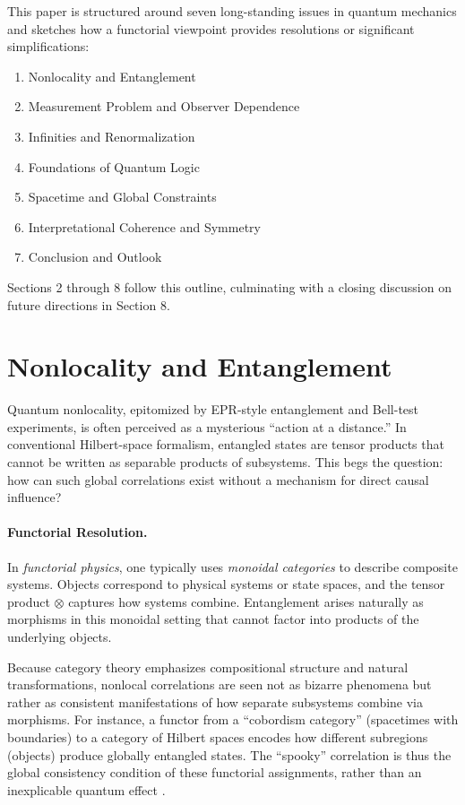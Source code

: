 \documentclass[12pt]{article}
\begin{document}
This paper is structured around seven long-standing issues in quantum mechanics and sketches how a functorial viewpoint provides resolutions or significant simplifications:

\begin{enumerate}
    \item Nonlocality and Entanglement
    \item Measurement Problem and Observer Dependence
    \item Infinities and Renormalization
    \item Foundations of Quantum Logic
    \item Spacetime and Global Constraints
    \item Interpretational Coherence and Symmetry
    \item Conclusion and Outlook
\end{enumerate}

Sections 2 through 8 follow this outline, culminating with a closing discussion on future directions in Section 8.

\vspace{1em}

\section{Nonlocality and Entanglement}
Quantum nonlocality, epitomized by EPR-style entanglement and Bell-test experiments, is often perceived as a mysterious ``action at a distance.'' In conventional Hilbert-space formalism, entangled states are tensor products that cannot be written as separable products of subsystems. This begs the question: how can such global correlations exist without a mechanism for direct causal influence?

\paragraph{Functorial Resolution.}
In \emph{functorial physics}, one typically uses \emph{monoidal categories} to describe composite systems. Objects correspond to physical systems or state spaces, and the tensor product $\otimes$ captures how systems combine. Entanglement arises naturally as morphisms in this monoidal setting that cannot factor into products of the underlying objects. 

Because category theory emphasizes compositional structure and natural transformations, nonlocal correlations are seen not as bizarre phenomena but rather as consistent manifestations of how separate subsystems combine via morphisms. For instance, a functor from a ``cobordism category'' (spacetimes with boundaries) to a category of Hilbert spaces encodes how different subregions (objects) produce globally entangled states. The “spooky” correlation is thus the global consistency condition of these functorial assignments, rather than an inexplicable quantum effect \cite{Baez, AbramskyCoecke}.
\end{document}
